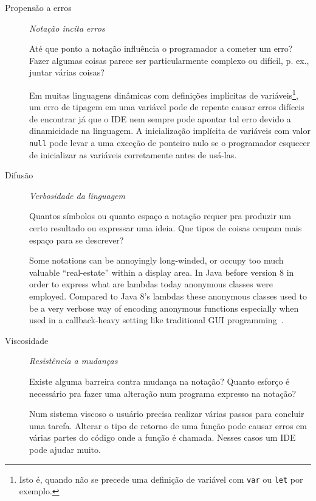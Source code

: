 \begin{description}
\item[{Propensão a erros}] \emph{Notação incita erros}

Até que ponto a notação influência o programador a cometer um erro? Fazer
algumas coisas parece ser particularmente complexo ou difícil, p. ex.,
juntar várias coisas?

Em muitas linguagens dinâmicas com definições implícitas de
variáveis\footnote{Isto é, quando não se precede uma definição de variável
com \texttt{var} ou \texttt{let} por exemplo.}, um erro de tipagem em uma variável pode
de repente causar erros difíceis de encontrar já que o IDE nem sempre
pode apontar tal erro devido a dinamicidade na linguagem. A inicialização
implícita de variáveis com valor \texttt{null} pode levar a uma exceção de
ponteiro nulo se o programador esquecer de inicializar as variáveis
corretamente antes de usá-las.

\item[{Difusão        }]  \emph{Verbosidade da linguagem}

Quantos símbolos ou quanto espaço a notação requer pra produzir um certo
resultado ou expressar uma ideia. Que tipos de coisas ocupam mais espaço
para se descrever?

\begin{citacao}
  Some notations can be annoyingly long-winded, or occupy too much valuable
  “real-estate” within a display area. In Java before version 8 in order to
  express what are lambdas today anonymous classes were employed. Compared to
  Java 8’s lambdas these anonymous classes used to be a very verbose way of
  encoding anonymous functions especially when used in a callback-heavy setting
  like traditional GUI programming~\cite[p.~14]{kiss2014}.
\end{citacao}

\item[{Viscosidade    }] \emph{Resistência a mudanças}

Existe alguma barreira contra mudança na notação? Quanto esforço é
necessário pra fazer uma alteração num programa expresso na notação?

Num sistema viscoso o usuário precisa realizar várias passos para
concluir uma tarefa. Alterar o tipo de retorno de uma função pode causar
erros em várias partes do código onde a função é chamada. Nesses casos um
IDE pode ajudar muito.
\end{description}


